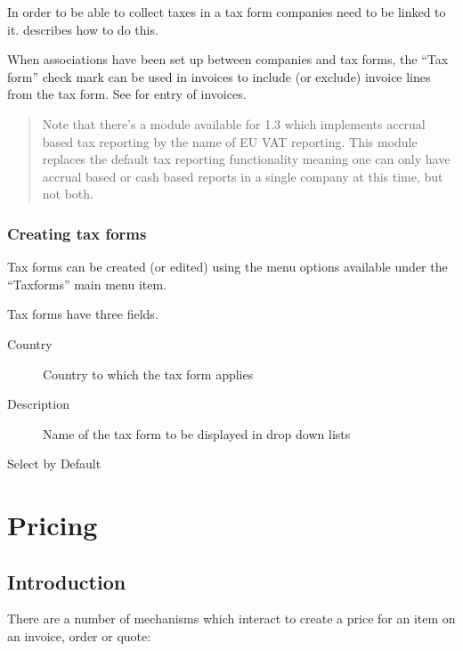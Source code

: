 In order to be able to collect taxes in a tax form companies need to be
linked to it.  describes how to do this.

When associations have been set up between companies and
tax forms, the ``Tax form'' check mark can be used in invoices to include
(or exclude) invoice lines from the tax form. See 
for entry of invoices.

\begin{quote}
Note that there's a module available for 1.3 which implements accrual based tax reporting by
the name of EU VAT reporting. This module replaces the default tax reporting functionality
meaning one can only have accrual based or cash based reports in a single company at this time,
but not both.
\end{quote}

\subsection{Creating tax forms}
\label{subsec-tax-taxforms-creation}

Tax forms can be created (or edited) using the menu options available under the
``Taxforms'' main menu item.

Tax forms have three fields.

\begin{description}
\item [Country] Country to which the tax form applies
\item [Description] Name of the tax form to be displayed in drop down lists
\item [Select by Default] %
\end{description}



\chapter{Pricing}
\label{cha-pricing}

\section{Introduction}
\label{sec-pricing-introduction}

There are a number of mechanisms which interact to create a price for an item
on an invoice, order or quote:

